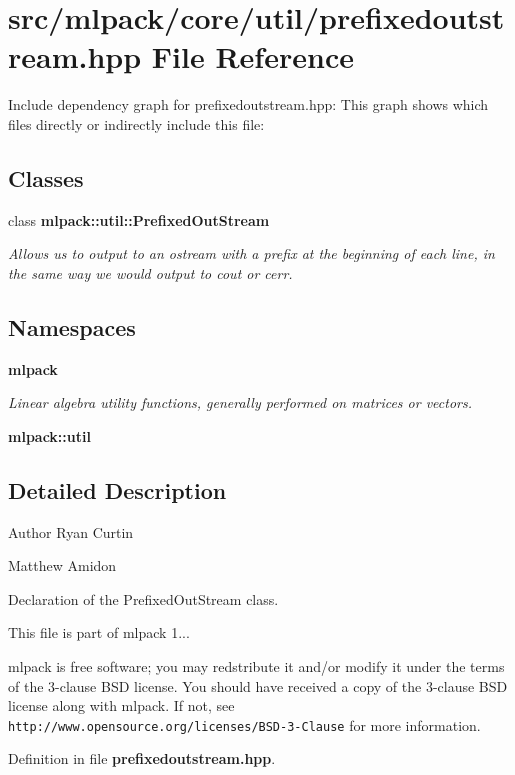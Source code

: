 \section{src/mlpack/core/util/prefixedoutstream.hpp File Reference}
\label{prefixedoutstream_8hpp}
Include dependency graph for prefixedoutstream.\-hpp\-:
This graph shows which files directly or indirectly include this file\-:
\subsection*{Classes}
\begin{DoxyCompactItemize}
\item 
class {\bf mlpack\-::util\-::\-Prefixed\-Out\-Stream}
\begin{DoxyCompactList}\small\item\em Allows us to output to an ostream with a prefix at the beginning of each line, in the same way we would output to cout or cerr. \end{DoxyCompactList}\end{DoxyCompactItemize}
\subsection*{Namespaces}
\begin{DoxyCompactItemize}
\item 
{\bf mlpack}
\begin{DoxyCompactList}\small\item\em Linear algebra utility functions, generally performed on matrices or vectors. \end{DoxyCompactList}\item 
{\bf mlpack\-::util}
\end{DoxyCompactItemize}


\subsection{Detailed Description}
\begin{DoxyAuthor}{Author}
Ryan Curtin 

Matthew Amidon
\end{DoxyAuthor}
Declaration of the Prefixed\-Out\-Stream class.

This file is part of mlpack 1...

mlpack is free software; you may redstribute it and/or modify it under the terms of the 3-\/clause B\-S\-D license. You should have received a copy of the 3-\/clause B\-S\-D license along with mlpack. If not, see {\tt http\-://www.\-opensource.\-org/licenses/\-B\-S\-D-\/3-\/\-Clause} for more information. 

Definition in file {\bf prefixedoutstream.\-hpp}.

